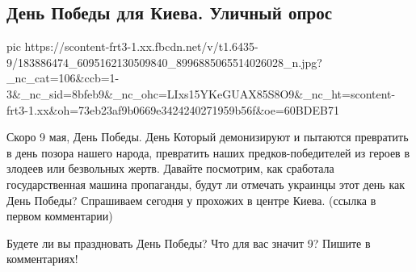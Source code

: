  
 
 
 
 
\subsection{День Победы для Киева. Уличный опрос}


\ifcmt
  pic https://scontent-frt3-1.xx.fbcdn.net/v/t1.6435-9/183886474_6095162130509840_8996885065514026028_n.jpg?_nc_cat=106&ccb=1-3&_nc_sid=8bfeb9&_nc_ohc=LIxs15YKeGUAX85S8O9&_nc_ht=scontent-frt3-1.xx&oh=73eb23af9b0669e3424240271959b56f&oe=60BDEB71
\fi


Скоро 9 мая, День Победы. День Который демонизируют и пытаются превратить в
день позора нашего народа, превратить наших предков-победителей из героев в
злодеев или безвольных жертв. Давайте посмотрим, как сработала государственная
машина пропаганды, будут ли отмечать украинцы этот день как День Победы?
Спрашиваем сегодня у прохожих в центре Киева.  (ссылка в первом комментарии)

Будете ли вы праздновать День Победы? Что для вас значит 9? Пишите в
комментариях!
